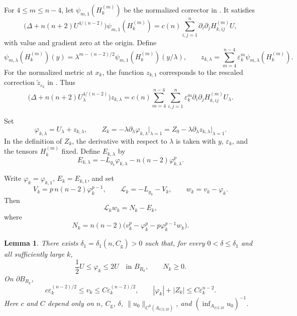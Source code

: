 \documentclass[11pt]{article}
\numberwithin{equation}{section}
\newtheorem{lemma}[theorem]{Lemma}
\theoremstyle{remark}
\begin{document}
{For \(4\le m\le n-4\), let
\(\psi_{m,1}(H_k^{(m)})\) be the normalized corrector in
\cite[Proposition  4.1]{KMS}. It satisfies
\begin{equation}\label{eq:upper-polynomial-correction}
 \bigl(\Delta+n(n+2)U^{4/(n-2)}\bigr)\psi_{m,1}(H_k^{(m)})
 =c(n)\sum_{i,j=1}^n\partial_i\partial_jH_{k,ij}^{(m)}U,
\end{equation}
with value and gradient zero at the origin. 
Define
\[
 \psi_{m,\lambda}(H_k^{(m)})(y)
 =\lambda^{m-(n-2)/2}\psi_{m,1}(H_k^{(m)})(y/\lambda),
 \qquad
 z_{k,\lambda}=\sum_{m=4}^{n-4}\varepsilon_k^m
 \psi_{m,\lambda}(H_k^{(m)}).
\]
For the normalized metric at \(x_k\), the function \(z_{k,1}\)
corresponds to the rescaled correction
\(\widetilde z_{\varepsilon_k}\) in \cite[Section  4]{KMS}.
Thus
\[
 \bigl(\Delta+n(n+2)U_\lambda^{4/(n-2)}\bigr)z_{k,\lambda}
 =c(n)\sum_{m=4}^{n-4}\sum_{i,j=1}^n
 \varepsilon_k^m\partial_i\partial_jH_{k,ij}^{(m)}U_\lambda.
\]

Set
\[
 \varphi_{k,\lambda}=U_\lambda+z_{k,\lambda},\qquad
 Z_k=-\lambda\partial_\lambda\varphi_{k,\lambda}\big|_{\lambda=1}
 =Z_0-\lambda\partial_\lambda z_{k,\lambda}\big|_{\lambda=1}.
\]
In the definition of \(Z_k\), the derivative with respect to
\(\lambda\) is taken with \(y\), \(\varepsilon_k\), and the tensors
\(H_k^{(m)}\) fixed. Define \(E_{k,\lambda}\) by
\begin{equation}\label{eq:short-profile-residual}
 E_{k,\lambda}=-L_{g_k}\varphi_{k,\lambda}
       -n(n-2)\varphi_{k,\lambda}^{p}.
\end{equation}

Write \(\varphi_k=\varphi_{k,1}\), \(E_k=E_{k,1}\), and set
\[
 V_k=p\,n(n-2)\varphi_k^{p-1},\qquad
 \mathcal L_k=-L_{g_k}-V_k,\qquad
 w_k=v_k-\varphi_k.
\]
Then
\begin{equation}\label{eq:short-error-equation}
 \mathcal L_kw_k=N_k-E_k,
\end{equation}
where
\begin{equation}\label{eq:short-nonlinear-remainder}
 N_k=n(n-2)\bigl(v_k^p-\varphi_k^p
        -p\varphi_k^{p-1}w_k\bigr).
\end{equation}
}

 \begin{lemma}\label{lem:profile-boundary-estimates}
There exists $\delta_1=\delta_1(n,C_{\mathrm g})>0$ such that, for every
$0<\delta\le\delta_1$ and all sufficiently large $k$,
{
\[
 \frac12U\le\varphi_k\le2U\quad\text{in }B_{R_k},
 \qquad N_k\ge0.
\]
}
 On $\partial B_{R_k}$,
{
\[
 c\varepsilon_k^{(n-2)/2}\le v_k\le
 C\varepsilon_k^{(n-2)/2},
 \qquad
 |\varphi_k|+|Z_k|\le C\varepsilon_k^{n-2}.
\]
}
 Here $c$ and $C$ depend only on $n$, $C_{\mathrm g}$, $\delta$,
$\|u_0\|_{C^0(A_{\delta/2,2\delta})}$, and
 $(\inf_{A_{\delta/2,2\delta}}u_0)^{-1}$.
\end{lemma}
\end{document}
